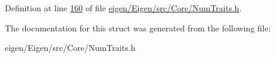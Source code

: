 Definition at line \hyperlink{eigen_2_eigen_2src_2_core_2_num_traits_8h_source_l00160}{160} of file \hyperlink{eigen_2_eigen_2src_2_core_2_num_traits_8h_source}{eigen/\+Eigen/src/\+Core/\+Num\+Traits.\+h}.



The documentation for this struct was generated from the following file\+:\begin{DoxyCompactItemize}
\item 
eigen/\+Eigen/src/\+Core/\+Num\+Traits.\+h\end{DoxyCompactItemize}
